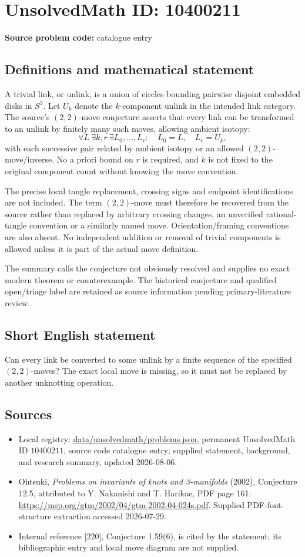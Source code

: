 \documentclass[11pt]{article}
\begin{document}
\section*{UnsolvedMath ID: 10400211}
\textbf{Source problem code:} catalogue entry
\subsection{Definitions and mathematical statement}
A trivial link, or unlink, is a union of circles bounding pairwise disjoint embedded disks in \(S^3\). Let \(U_k\) denote the \(k\)-component unlink in the intended link category. The source's \((2,2)\)-move conjecture asserts that every link can be transformed to an unlink by finitely many such moves, allowing ambient isotopy:
\[
 \forall L\ \exists k,r\ \exists L_0,\ldots,L_r:\quad
 L_0=L,\quad L_r=U_k,
\]
with each successive pair related by ambient isotopy or an allowed \((2,2)\)-move/inverse. No a priori bound on \(r\) is required, and \(k\) is not fixed to the original component count without knowing the move convention.

The precise local tangle replacement, crossing signs and endpoint identifications are not included. The term \((2,2)\)-move must therefore be recovered from the source rather than replaced by arbitrary crossing changes, an unverified rational-tangle convention or a similarly named move. Orientation/framing conventions are also absent. No independent addition or removal of trivial components is allowed unless it is part of the actual move definition.

The summary calls the conjecture not obviously resolved and supplies no exact modern theorem or counterexample. The historical conjecture and qualified open/triage label are retained as source information pending primary-literature review.
\subsection{Short English statement}
Can every link be converted to some unlink by a finite sequence of the specified \((2,2)\)-moves? The exact local move is missing, so it must not be replaced by another unknotting operation.
\subsection{Sources}
\begin{itemize}
\item Local registry: \url{data/unsolvedmath/problems.json}, permanent UnsolvedMath ID \(10400211\), source code catalogue entry; supplied statement, background, and research summary, updated 2026-08-06.
\item Ohtsuki, \emph{Problems on invariants of knots and 3-manifolds} (2002), Conjecture 12.5, attributed to Y. Nakanishi and T. Harikae, PDF page 161: \url{https://msp.org/gtm/2002/04/gtm-2002-04-024s.pdf}. Supplied PDF-font-structure extraction accessed 2026-07-29.
\item Internal reference [220], Conjecture 1.59(6), is cited by the statement; its bibliographic entry and local move diagram are not supplied.
\end{itemize}
\end{document}
